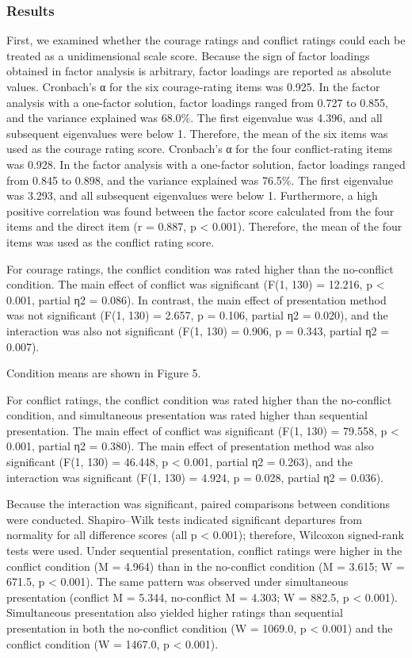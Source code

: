 \documentclass[
]{article}
\begin{document}
\subsubsection{Results}\label{results}

First, we examined whether the courage ratings and conflict ratings
could each be treated as a unidimensional scale score. Because the sign
of factor loadings obtained in factor analysis is arbitrary, factor
loadings are reported as absolute values. Cronbach's α for the six
courage-rating items was 0.925. In the factor analysis with a one-factor
solution, factor loadings ranged from 0.727 to 0.855, and the variance
explained was 68.0\%. The first eigenvalue was 4.396, and all subsequent
eigenvalues were below 1. Therefore, the mean of the six items was used
as the courage rating score. Cronbach's α for the four conflict-rating
items was 0.928. In the factor analysis with a one-factor solution,
factor loadings ranged from 0.845 to 0.898, and the variance explained
was 76.5\%. The first eigenvalue was 3.293, and all subsequent
eigenvalues were below 1. Furthermore, a high positive correlation was
found between the factor score calculated from the four items and the
direct item (r = 0.887, p \textless{} 0.001). Therefore, the mean of the
four items was used as the conflict rating score.

For courage ratings, the conflict condition was rated higher than the
no-conflict condition. The main effect of conflict was significant (F(1,
130) = 12.216, p \textless{} 0.001, partial η2 = 0.086). In contrast,
the main effect of presentation method was not significant (F(1, 130) =
2.657, p = 0.106, partial η2 = 0.020), and the interaction was also not
significant (F(1, 130) = 0.906, p = 0.343, partial η2 = 0.007).

Condition means are shown in Figure 5.

For conflict ratings, the conflict condition was rated higher than the
no-conflict condition, and simultaneous presentation was rated higher
than sequential presentation. The main effect of conflict was
significant (F(1, 130) = 79.558, p \textless{} 0.001, partial η2 =
0.380). The main effect of presentation method was also significant
(F(1, 130) = 46.448, p \textless{} 0.001, partial η2 = 0.263), and the
interaction was significant (F(1, 130) = 4.924, p = 0.028, partial η2 =
0.036).

Because the interaction was significant, paired comparisons between
conditions were conducted. Shapiro--Wilk tests indicated significant
departures from normality for all difference scores (all p \textless{}
0.001); therefore, Wilcoxon signed-rank tests were used. Under
sequential presentation, conflict ratings were higher in the conflict
condition (M = 4.964) than in the no-conflict condition (M = 3.615; W =
671.5, p \textless{} 0.001). The same pattern was observed under
simultaneous presentation (conflict M = 5.344, no-conflict M = 4.303; W
= 882.5, p \textless{} 0.001). Simultaneous presentation also yielded
higher ratings than sequential presentation in both the no-conflict
condition (W = 1069.0, p \textless{} 0.001) and the conflict condition
(W = 1467.0, p \textless{} 0.001).
\end{document}
